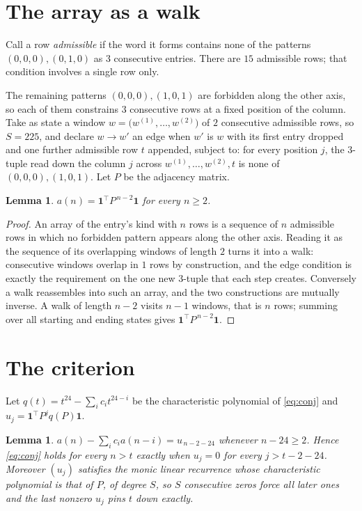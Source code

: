 \documentclass[11pt,a4paper]{article}
\theoremstyle{plain}
\newtheorem{lemma}[theorem]{Lemma}
\theoremstyle{definition}
\begin{document}
\section{The array as a walk}

Call a row \emph{admissible} if the word it forms contains none of the patterns
$(0,0,0), (0,1,0)$ as $3$ consecutive entries. There are $15$ admissible rows; that condition
involves a single row only.

The remaining patterns $(0,0,0), (1,0,1)$ are forbidden along the other axis, so each of them
constrains $3$ consecutive rows at a fixed position of the column. Take as state a
window $w=\bigl(w^{(1)},\dots,w^{(2)}\bigr)$ of $2$ consecutive admissible
rows, so $S=225$, and declare $w\to w'$ an edge when $w'$ is $w$ with its first entry
dropped and one further admissible row $t$ appended, subject to: for every position
$j$, the $3$-tuple read down the column $j$ across $w^{(1)},\dots,w^{(2)},t$
is none of $(0,0,0), (1,0,1)$. Let $P$ be the adjacency matrix.

\begin{lemma}\label{lem:walk}
$a(n)=\mathbf{1}^{\!\top}P^{\,n-2}\mathbf{1}$ for every $n\ge2$.
\end{lemma}

\begin{proof}
An array of the entry's kind with $n$ rows is a sequence of $n$ admissible rows in
which no forbidden pattern appears along the other axis. Reading it as the sequence of its
overlapping windows of length $2$ turns it into a walk: consecutive windows overlap in
$1$ rows by construction, and the edge condition is exactly the requirement on the one
new $3$-tuple that each step creates. Conversely a walk reassembles into such an array,
and the two constructions are mutually inverse. A walk of length $n-2$ visits $n-1$
windows, that is $n$ rows; summing over all starting and ending states gives
$\mathbf{1}^{\!\top}P^{\,n-2}\mathbf{1}$.
\end{proof}

\section{The criterion}

Let $q(t)=t^{24}-\sum_i c_i t^{24-i}$ be the characteristic polynomial of
\eqref{eq:conj} and $u_j=\mathbf{1}^{\!\top}P^{j}q(P)\mathbf{1}$.

\begin{lemma}\label{lem:crit}
$a(n)-\sum_i c_i a(n-i)=u_{\,n-2-24}$ whenever $n-24\ge2$. Hence
\eqref{eq:conj} holds for every $n>t$ exactly when $u_j=0$ for every
$j>t-2-24$. Moreover $(u_j)$ satisfies the monic linear recurrence whose
characteristic polynomial is that of $P$, of degree $S$, so $S$ consecutive zeros force all
later ones and the last nonzero $u_j$ pins $t$ down exactly.
\end{lemma}
\end{document}
